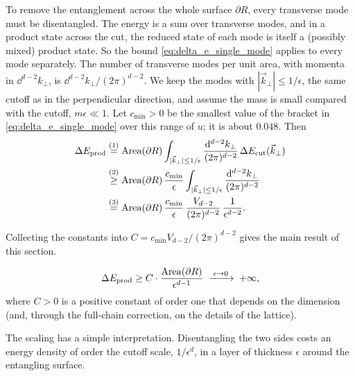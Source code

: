 To remove the entanglement across the whole surface $\partial R$, every transverse mode must be disentangled.
The energy is a sum over transverse modes, and in a product state across the cut, the reduced state of each
mode is itself a (possibly mixed) product state. So the bound \eqref{eq:delta_e_single_mode} applies to every
mode separately. The number of transverse modes per unit area, with momenta in $\dd^{d-2}k_\perp$, is
$\dd^{d-2}k_\perp/(2\pi)^{d-2}$. We keep the modes with $|\vec k_\perp| \le 1/\epsilon$, the same cutoff as
in the perpendicular direction, and assume the mass is small compared with the cutoff, $m\epsilon\ll1$. Let
$c_{\min}>0$ be the smallest value of the bracket in \eqref{eq:delta_e_single_mode} over this range of $u$;
it is about $0.048$. Then
\begin{align}
\Delta E_{\rm prod} &\overset{(1)}{=} \mathrm{Area}(\partial R) \int_{|\vec k_\perp| \le 1/\epsilon}
\frac{\mathrm{d}^{d-2}k_\perp}{(2\pi)^{d-2}} \, \Delta E_{\rm cut}(\vec k_\perp) \notag \\
&\overset{(2)}{\ge} \mathrm{Area}(\partial R)\, \frac{c_{\min}}{\epsilon}
\int_{|\vec k_\perp| \le 1/\epsilon} \frac{\mathrm{d}^{d-2}k_\perp}{(2\pi)^{d-2}} \notag\\
&\overset{(3)}{=} \mathrm{Area}(\partial R)\, \frac{c_{\min}}{\epsilon}\,
\frac{V_{d-2}}{(2\pi)^{d-2}}\,\frac{1}{\epsilon^{d-2}} .
\label{eq:total_prod_energy_integral}
\end{align}
\quad
{}\quad
{}

Collecting the constants into $C = c_{\min}V_{d-2}/(2\pi)^{d-2}$ gives the main result of this section.
\begin{keyresult}
\begin{equation}
\Delta E_{\rm prod} \ge C \cdot \frac{\mathrm{Area}(\partial R)}{\epsilon^{d-1}} \;\xrightarrow{\;\epsilon \to 0\;} \; +\infty ,
\label{eq:product_state_energy_divergence}
\end{equation}
where $C > 0$ is a positive constant of order one that depends on the dimension (and, through the full-chain
correction, on the details of the lattice).
\end{keyresult}
The scaling has a simple interpretation. Disentangling the two sides costs an energy density of order the
cutoff scale, $1/\epsilon^{d}$, in a layer of thickness $\epsilon$ around the entangling surface.

